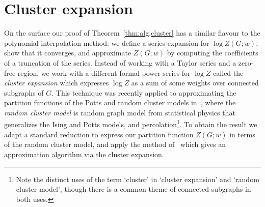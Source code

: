 \section{Cluster expansion}\label{sec:cluster}
%
On the surface our proof of Theorem~\ref{thm:alg,cluster} has a similar flavour to the polynomial interpolation method: we define a series expansion for $\log Z(G;w)$, show that it converges, and approximate $Z(G;w)$ by computing the coefficients of a truncation of the series. 
Instead of working with a Taylor series and a zero-free region, we work with a different formal power series for $\log Z$ called the \emph{cluster expansion} which expresses $\log Z$ as a sum of some weights over connected subgraphs of $G$. 
This technique was recently applied to approximating the partition functions of the Potts and random cluster models in~\cite{BCHPT19}, where the \emph{random cluster model} is random graph model from statistical physics that generalizes the Ising and Potts models, and percolation\footnote{Note the distinct uses of the term `cluster' in `cluster expansion' and `random cluster model', though there is a common theme of connected subgraphs in both uses.}.
To obtain the result we adapt a standard reduction to express our partition function $Z(G;w)$ in terms of the random cluster model, and apply the method of~\cite{BCHPT19} which gives an approximation algorithm via the cluster expansion.
%
